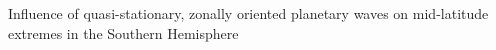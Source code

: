 Influence of quasi-stationary, zonally oriented planetary waves on mid-latitude extremes in the Southern Hemisphere